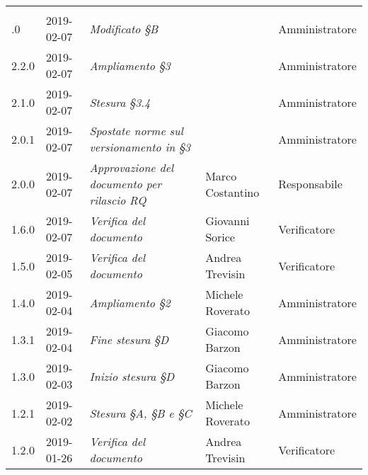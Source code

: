\newpage 
\section*{}
	\begin{longtable}{C{2cm}|C{2.5cm}|C{4.5cm}|C{2.5cm}|C{3cm}}

		 &  &  &  &   \\
		.0 & 2019-02-07 & \emph{Modificato §B} &  & Amministratore \\
		\hline
		
		2.2.0 & 2019-02-07 & \emph{Ampliamento §3} &  & Amministratore \\
		\hline
		
		2.1.0 & 2019-02-07 & \emph{Stesura §3.4} &  & Amministratore \\
		\hline
		
		2.0.1 & 2019-02-07 & \emph{Spostate norme sul versionamento in §3} &  & Amministratore \\
		\hline
		
		2.0.0 & 2019-02-07 & \emph{Approvazione del documento per rilascio RQ} & Marco Costantino & Responsabile \\
		\hline
		
		1.6.0 & 2019-02-07 & \emph{Verifica del documento}  & Giovanni Sorice & Verificatore  \\
		\hline
		
		1.5.0 & 2019-02-05 & \emph{Verifica del documento} & Andrea Trevisin & Verificatore  \\
		\hline
		
		1.4.0 & 2019-02-04 & \emph{Ampliamento §2} & Michele Roverato & Amministratore  \\
		\hline
		
		 1.3.1 & 2019-02-04 & \emph{Fine stesura §D} & Giacomo Barzon & Amministratore \\
		\hline
		
		1.3.0 & 2019-02-03 & \emph{Inizio stesura §D} & Giacomo Barzon & Amministratore  \\
		\hline
		
		1.2.1 & 2019-02-02 & \emph{Stesura §A, §B e §C} & Michele Roverato & Amministratore  \\
		\hline
		
		1.2.0 & 2019-01-26 & \emph{Verifica del documento} & Andrea Trevisin & Verificatore  \\
		\hline
		

\end{longtable}
